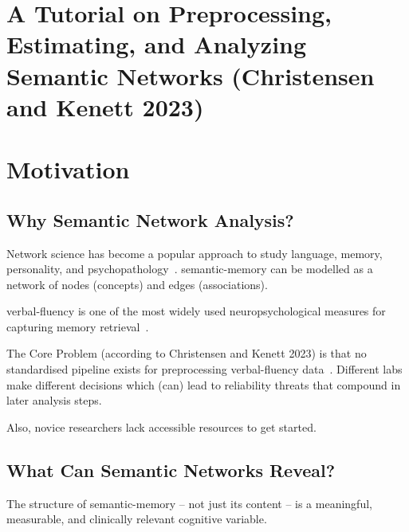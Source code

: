 
\section*{A Tutorial on Preprocessing, Estimating, and Analyzing Semantic
Networks (Christensen and Kenett 2023)}

\section{Motivation}\label{sec:motivation}

\subsection*{Why Semantic Network Analysis?}
Network science has become a popular approach to study language, memory, personality, and psychopathology~\cite{SiewEtAl2019}.
\Gls{semantic-memory} can be modelled as a network of
nodes (concepts) and edges (associations).

\Gls{verbal-fluency} is one of the most widely
used neuropsychological measures for
capturing memory retrieval~\cite{Ardila2006}.

The Core Problem (according to Christensen and
Kenett 2023) is that no standardised pipeline exists
for preprocessing \gls{verbal-fluency}
data~\cite{ChristensenKenett2023}.
Different labs make different
decisions which (can) lead to reliability threats
that compound in later analysis
steps.

Also, novice researchers lack accessible
resources to get started.

\subsection*{What Can Semantic Networks Reveal?}

The structure of \gls{semantic-memory} -- not just its content -- is a meaningful,
measurable, and clinically relevant cognitive variable.

